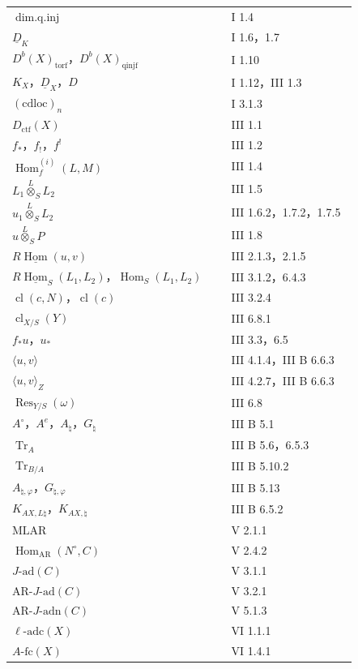\begin{longtable}{@{}p{0.61\linewidth}p{0.35\linewidth}@{}}
$\operatorname{dim.q.inj}$ & I 1.4\\
$\underline D_K$ & I 1.6，1.7\\
$D^b(X)_{\mathrm{torf}}$，$D^b(X)_{\mathrm{qinjf}}$ & I 1.10\\
$K_X$，$\underline D_X$，$D$ & I 1.12，III 1.3\\
$(\mathrm{cdloc})_n$ & I 3.1.3\\
$D_{\mathrm{ctf}}(X)$ & III 1.1\\
$f_*$，$f_!$，$f^!$ & III 1.2\\
$\operatorname{Hom}^{(i)}_f(L,M)$ & III 1.4\\
$L_1\overset L\otimes_S L_2$ & III 1.5\\
$u_1\overset L\otimes_S L_2$ & III 1.6.2，1.7.2，1.7.5\\
$u\overset L\otimes_S P$ & III 1.8\\
$R\underline{\operatorname{Hom}}(u,v)$ & III 2.1.3，2.1.5\\
$R\underline{\operatorname{Hom}}_S(L_1,L_2)$，$\operatorname{Hom}_S(L_1,L_2)$ & III 3.1.2，6.4.3\\
$\operatorname{cl}(c,N)$，$\operatorname{cl}(c)$ & III 3.2.4\\
$\operatorname{cl}_{X/S}(Y)$ & III 6.8.1\\
$f_*u$，$u_*$ & III 3.3，6.5\\
$\langle u,v\rangle$ & III 4.1.4，III B 6.6.3\\
$\langle u,v\rangle_Z$ & III 4.2.7，III B 6.6.3\\
$\operatorname{Res}_{Y/S}(\omega)$ & III 6.8\\
$A^\circ$，$A^e$，$A_\natural$，$G_\natural$ & III B 5.1\\
$\operatorname{Tr}_A$ & III B 5.6，6.5.3\\
$\operatorname{Tr}_{B/A}$ & III B 5.10.2\\
$A_{\natural,\varphi}$，$G_{\natural,\varphi}$ & III B 5.13\\
$K_{AX,L\natural}$，$K_{AX,\natural}$ & III B 6.5.2\\
$\mathrm{MLAR}$ & V 2.1.1\\
$\operatorname{Hom}_{\mathrm{AR}}(N^\circ,C)$ & V 2.4.2\\
$J\text{-}\mathrm{ad}(C)$ & V 3.1.1\\
$\mathrm{AR}\text{-}J\text{-}\mathrm{ad}(C)$ & V 3.2.1\\
$\mathrm{AR}\text{-}J\text{-}\mathrm{adn}(C)$ & V 5.1.3\\
$\ell\text{-}\mathrm{adc}(X)$ & VI 1.1.1\\
$A\text{-}\mathrm{fc}(X)$ & VI 1.4.1
\end{longtable}

